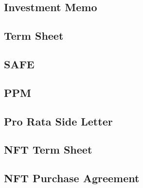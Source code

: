 \documentclass[11pt]{article}
\begin{document}
\subsection{Investment Memo}

\subsection{Term Sheet}

\subsection{SAFE}

\subsection{PPM}

\subsection{Pro Rata Side Letter}

\subsection{NFT Term Sheet}

\subsection{NFT Purchase Agreement}
\end{document}
